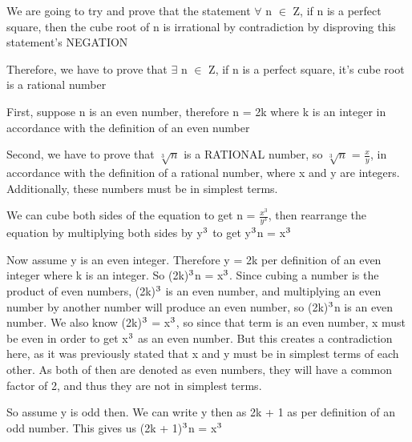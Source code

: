 \documentclass{article}
\begin{document}
\par\vspace{0.5cm}\noindent We are going to try and prove that the statement $\forall$ n $\in$ Z, if n is a perfect square, then the cube root of n is irrational by contradiction by disproving this statement's NEGATION

\par\vspace{0.5cm}\noindent Therefore, we have to prove that $\exists$ n $\in$ Z, if n is a perfect square, it's cube root is a rational number

\par\vspace{0.5cm}\noindent First, suppose n is an even number, therefore n = 2k where k is an integer in accordance with the definition of an even number

\par\vspace{0.5cm}\noindent Second, we have to prove that $\sqrt[3]{n}$ is a RATIONAL number, so $\sqrt[3]{n}$ = $\frac{x}{y}$, in accordance with the definition of a rational number, where x and y are integers.  Additionally, these numbers must be in simplest terms.

\par\vspace{0.5cm}\noindent We can cube both sides of the equation to get n = $\frac{x^3}{y^3}$, then rearrange the equation by multiplying both sides by y$\textsuperscript{3}$ to get y$\textsuperscript{3}$n = x$\textsuperscript{3}$

\par\vspace{0.5cm}\noindent Now assume y is an even integer.  Therefore y = 2k per definition of an even integer where k is an integer.  So (2k)$\textsuperscript{3}$n = x$\textsuperscript{3}$.  Since cubing a number is the product of even numbers, (2k)$\textsuperscript{3}$ is an even number, and multiplying an even number by another number will produce an even number, so (2k)$\textsuperscript{3}$n is an even number.  We also know (2k)$\textsuperscript{3}$  = x$\textsuperscript{3}$, so since that term is an even number, x must be even in order to get x$\textsuperscript{3}$ as an even number.  But this creates a contradiction here, as it was previously stated that x and y must be in simplest terms of each other.  As both of then are denoted as even numbers, they will have a common factor of 2, and thus they are not in simplest terms.

\par\vspace{0.5cm}\noindent So assume y is odd then.  We can write y then as 2k + 1 as per definition of an odd number.  This gives us (2k + 1)$\textsuperscript{3}$n = x$\textsuperscript{3}$
\end{document}
